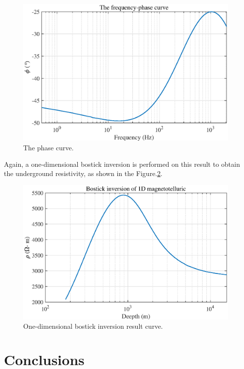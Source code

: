 \documentclass[9pt,a4paper,twoside]{rho-class/rho}
\begin{document}
\begin{figure}[htbp]
    \centering
    \includegraphics[width=0.95\columnwidth]{figures/YJBph.eps}
    \caption{The phase curve.}
    \label{fig:yjb-ph}
\end{figure}

Again, a one-dimensional bostick inversion is performed on this result to obtain the underground resistivity, as shown in the Figure.\ref{fig:yjb-r}.

\begin{figure}[htbp]
    \centering
    \includegraphics[width=0.95\columnwidth]{figures/YJBbostick.eps}
    \caption{One-dimensional bostick inversion result curve.}
    \label{fig:yjb-r}
\end{figure}

\section{Conclusions}
\end{document}

